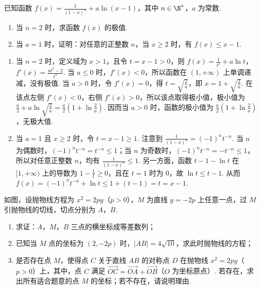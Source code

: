\begin{problem}
已知函数 \(f(x) = \frac{1}{(1 - x)^n} + a \ln(x - 1)\)，其中 \(n \in \N^*\)，\(a\) 为常数.
\begin{enumerate}
\item 当 \(n = 2\) 时，求函数 \(f(x)\) 的极值.
\item 当 \(a = 1\) 时，证明：对任意的正整数 \(n\)，当 \(x \geqslant 2\) 时，有 \(f(x) \leqslant x - 1\).
\end{enumerate}
\end{problem}

\begin{solution}
\begin{enumerate}
\item 当 \(n=2\) 时，定义域为 \(x>1\)，且令 \(t=x-1>0\)，则
\(f(x)=\frac1{t^2}+a\ln t\)，
\(f'(x)=\frac{at^2-2}{t^3}\). 当 \(a\leqslant0\) 时，\(f'(x)<0\)，所以函数在 \((1,+\infty)\) 上单调递减，没有极值. 当 \(a>0\) 时，令 \(f'(x)=0\)，得 \(t=\sqrt{\frac2a}\)，即 \(x=1+\sqrt{\frac2a}\). 在该点左侧 \(f'(x)<0\)，右侧 \(f'(x)>0\)，所以该点取得极小值，极小值为
\(\frac{a}{2}+a\ln\sqrt{\frac2a}=\frac a2\left(1+\ln\frac2a\right)\). 因而当 \(a>0\) 时，函数的极小值为 \(\frac a2\left(1+\ln\frac2a\right)\)，无极大值.

\item 当 \(a=1\) 且 \(x\geqslant2\) 时，令 \(t=x-1\geqslant1\). 注意到 \(\frac{1}{(1-x)^n}=(-1)^nt^{-n}\). 当 \(n\) 为偶数时，\((-1)^nt^{-n}=t^{-n}\leqslant1\)；当 \(n\) 为奇数时，\((-1)^nt^{-n}=-t^{-n}\leqslant1\)，所以对任意正整数 \(n\)，均有 \(\frac{1}{(1-x)^n}\leqslant1\). 另一方面，函数 \(t-1-\ln t\) 在 \([1,+\infty)\) 上的导数为 \(1-\frac1t\geqslant0\)，且在 \(t=1\) 时为 0，故 \(\ln t\leqslant t-1\). 从而 \(f(x)=(-1)^nt^{-n}+\ln t\leqslant1+(t-1)=t=x-1\).
\end{enumerate}
\end{solution}

\begin{problem}
如图，设抛物线方程为 \(x^{2} = 2py\)（\(p > 0\)），\(M\) 为直线 \(y = -2p\) 上任意一点，过 \(M\) 引抛物线的切线，切点分别为 \(A\)，\(B\).
\begin{enumerate}
\item 求证：\(A\)，\(M\)，\(B\) 三点的横坐标成等差数列；
\item 已知当 \(M\) 点的坐标为 \((2, -2p)\) 时，\(|AB| = 4\sqrt{10}\)，求此时抛物线的方程；
\item 是否存在点 \(M\)，使得点 \(C\) 关于直线 \(AB\) 的对称点 \(D\) 在抛物线 \(x^2 = 2py\)（\(p > 0\)）上，其中，点 \(C\) 满足 \(\overrightarrow{OC} = \overrightarrow{OA} + \overrightarrow{OB}\)（\(O\) 为坐标原点）. 若存在，求出所有适合题意的点 \(M\) 的坐标；若不存在，请说明理由.
\end{enumerate}

\end{problem}

